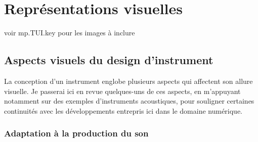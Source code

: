 %
\chapter{Représentations visuelles}
\label{ch:visual_representation}


voir mp.TUI.key pour les images à inclure

\section{Aspects visuels du design d'instrument}

\noindent La conception d'un instrument englobe plusieurs aspects qui affectent son allure visuelle. Je passerai ici en revue quelques-uns de ces aspects, en m'appuyant notamment sur des exemples d'instruments acoustiques, pour souligner certaines continuités avec les développements entrepris ici dans le domaine numérique.

\subsection{Adaptation à la production du son}


